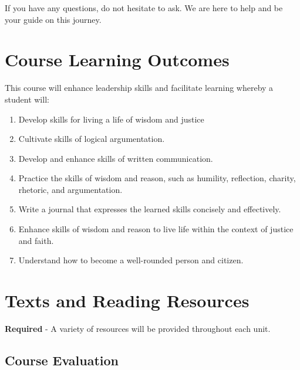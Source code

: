 \documentclass[
]{book}
\providecommand{\tightlist}{%
  \setlength{\itemsep}{0pt}\setlength{\parskip}{0pt}}
\begin{document}
If you have any questions, do not hesitate to ask. We are here to help and be your guide on this journey.

\hypertarget{course-learning-outcomes}{%
\section*{Course Learning Outcomes}\label{course-learning-outcomes}}

This course will enhance leadership skills and facilitate learning whereby a student will:

\begin{enumerate}
\def\labelenumi{\arabic{enumi}.}
\tightlist
\item
  Develop skills for living a life of wisdom and justice\\
\item
  Cultivate skills of logical argumentation.\\
\item
  Develop and enhance skills of written communication.\\
\item
  Practice the skills of wisdom and reason, such as humility, reflection, charity, rhetoric, and argumentation.\\
\item
  Write a journal that expresses the learned skills concisely and effectively.\\
\item
  Enhance skills of wisdom and reason to live life within the context of justice and faith.\\
\item
  Understand how to become a well-rounded person and citizen.
\end{enumerate}

\hypertarget{texts-and-reading-resources}{%
\section*{Texts and Reading Resources}\label{texts-and-reading-resources}}

\textbf{Required}
- A variety of resources will be provided throughout each unit.

\hypertarget{course-evaluation}{%
\subsection{Course Evaluation}\label{course-evaluation}}
\end{document}
